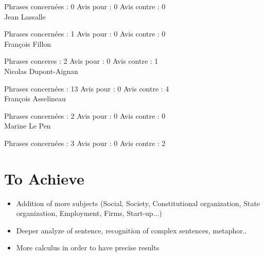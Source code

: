 \documentclass{article}
\begin{document}
Phrases concernées : 0
Avis pour : 0
Avis contre : 0
\\
Jean Lassalle

Phrases concernées : 1
Avis pour : 0
Avis contre : 0
\\
François Fillon

Phrases conceres : 2
Avis pour : 0
Avis contre : 1
\\
Nicolas Dupont-Aignan


Phrases concernées : 13
Avis pour : 0
Avis contre : 4
\\
François Asselineau


Phrases concernées : 2
Avis pour : 0
Avis contre : 0
\\
Marine Le Pen


Phrases concernées : 3
Avis pour : 0
Avis contre : 2



\section{To Achieve}
\begin{itemize}
    \item Addition of more subjects (Social, Society, Constitutional organization, State organization, Employment, Firms, Start-up...)
    \item Deeper analyze of sentence, recognition of complex sentences, metaphor..
    \item More calculus in order to have precise results
\end{itemize}
\end{document}

